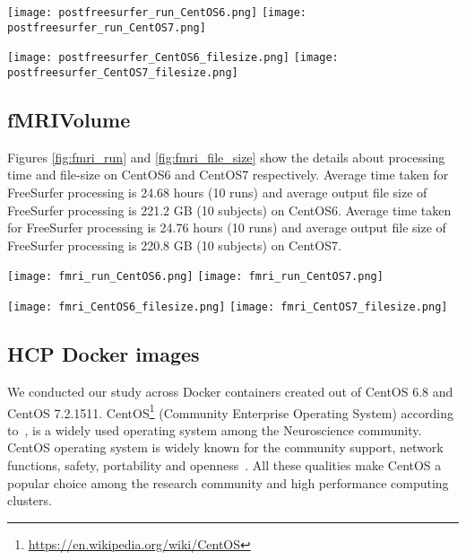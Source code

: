 \begin{center}
\texttt{[image: postfreesurfer\_run\_CentOS6.png]}%
\texttt{[image: postfreesurfer\_run\_CentOS7.png]}
\label{fig:postfreesurfer_run}
\end{center}

\begin{center}
\texttt{[image: postfreesurfer\_CentOS6\_filesize.png]}%
\texttt{[image: postfreesurfer\_CentOS7\_filesize.png]}
\label{fig:postfreesurfer_file_size}
\end{center}

\subsection{fMRIVolume}
Figures \ref{fig:fmri_run} and \ref{fig:fmri_file_size} show the details about processing time and file-size on CentOS6 and CentOS7 respectively.
Average time taken for FreeSurfer processing is 24.68 hours (10 runs) and average output file size of FreeSurfer processing is 221.2 GB (10 subjects) on CentOS6.
Average time taken for FreeSurfer processing is 24.76 hours (10 runs) and average output file size of FreeSurfer processing is 220.8 GB (10 subjects) on CentOS7.

\begin{center}
\texttt{[image: fmri\_run\_CentOS6.png]}%
\texttt{[image: fmri\_run\_CentOS7.png]}
\label{fig:fmri_run}
\end{center}

\begin{center}
\texttt{[image: fmri\_CentOS6\_filesize.png]}%
\texttt{[image: fmri\_CentOS7\_filesize.png]}
\label{fig:fmri_file_size}
\end{center}

\subsection{HCP Docker images}
We conducted our study across Docker containers created out of CentOS 6.8 and CentOS 7.2.1511. CentOS\footnote{\url{https://en.wikipedia.org/wiki/CentOS}} (Community Enterprise Operating System) according to~\cite{CentOS}, is a widely used operating system among the Neuroscience community. CentOS operating system is widely known for the community support, network functions, safety, portability and openness~\cite{5665431}. All these qualities make CentOS a popular choice among the research community and high performance computing clusters.

